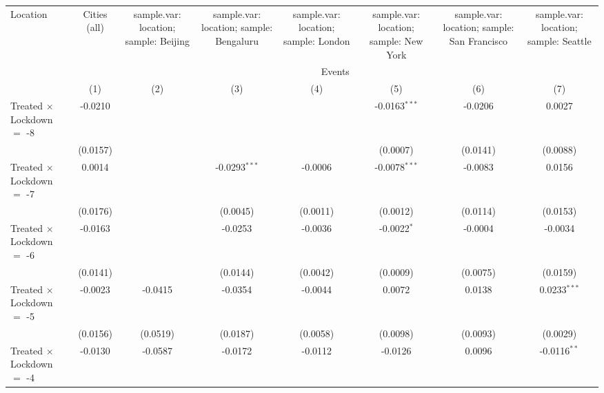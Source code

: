 
\begingroup
\centering
\begin{tabular}{lccccccc}
   \toprule
   Location & Cities (all) & sample.var: location; sample: Beijing & sample.var: location; sample: Bengaluru & sample.var: location; sample: London & sample.var: location; sample: New York & sample.var: location; sample: San Francisco & sample.var: location; sample: Seattle \\ \cmidrule(lr){2-2} \cmidrule(lr){3-3} \cmidrule(lr){4-4} \cmidrule(lr){5-5} \cmidrule(lr){6-6} \cmidrule(lr){7-7} \cmidrule(lr){8-8}
    & \multicolumn{7}{c}{Events}\\
                                     & (1)           & (2)           & (3)             & (4)             & (5)                    & (6)           & (7)\\  
   \midrule 
   Treated $\times$ Lockdown $=$ -8  & -0.0210       &               &                 &                 & -0.0163$^{***}$        & -0.0206       & 0.0027\\   
                                     & (0.0157)      &               &                 &                 & (0.0007)               & (0.0141)      & (0.0088)\\   
   Treated $\times$ Lockdown $=$ -7  & 0.0014        &               & -0.0293$^{***}$ & -0.0006         & -0.0078$^{***}$        & -0.0083       & 0.0156\\   
                                     & (0.0176)      &               & (0.0045)        & (0.0011)        & (0.0012)               & (0.0114)      & (0.0153)\\   
   Treated $\times$ Lockdown $=$ -6  & -0.0163       &               & -0.0253         & -0.0036         & -0.0022$^{*}$          & -0.0004       & -0.0034\\   
                                     & (0.0141)      &               & (0.0144)        & (0.0042)        & (0.0009)               & (0.0075)      & (0.0159)\\   
   Treated $\times$ Lockdown $=$ -5  & -0.0023       & -0.0415       & -0.0354         & -0.0044         & 0.0072                 & 0.0138        & 0.0233$^{***}$\\   
                                     & (0.0156)      & (0.0519)      & (0.0187)        & (0.0058)        & (0.0098)               & (0.0093)      & (0.0029)\\   
   Treated $\times$ Lockdown $=$ -4  & -0.0130       & -0.0587       & -0.0172         & -0.0112         & -0.0126                & 0.0096        & -0.0116$^{**}$\\   

\end{tabular}
